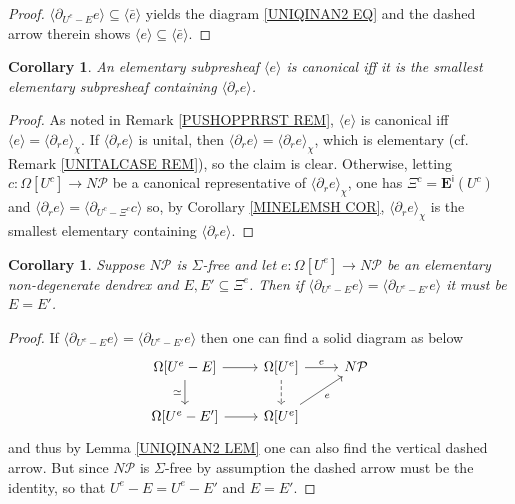 \documentclass[a4paper,10pt]{article}%
\numberwithin{equation}{section}
\numberwithin{figure}{section}
\newtheorem{corollary}[equation]{Corollary}%
\theoremstyle{definition} %
\newcommand{\1}{\ensuremath{\mathbbm 1}}%
\begin{document}
\begin{proof}
	$\langle \partial_{U^e - E} e\rangle
	\subseteq \langle \bar{e} \rangle$
	yields the diagram \eqref{UNIQINAN2 EQ}
	and the dashed arrow therein shows
	$\langle e\rangle
	\subseteq \langle \bar{e} \rangle$.
\end{proof}



\begin{corollary}\label{CANCHAR COR}
	An elementary subpresheaf $\langle e \rangle$
	is canonical iff
	it is the smallest elementary subpresheaf containing
	$\langle \partial_r e \rangle$.
\end{corollary}



\begin{proof}
	As noted in Remark \ref{PUSHOPPRRST REM}, 
	$\langle e \rangle$ is canonical iff
	$\langle e \rangle = \langle \partial_r e \rangle_{\chi}$.
	If $\langle \partial_r e \rangle$ is unital, then 
	$\langle \partial_r e \rangle = \langle \partial_r e \rangle_{\chi}$,
	which is elementary (cf. Remark \ref{UNITALCASE REM}), so the claim is clear.
	Otherwise, letting 
	$c \colon \Omega[U^c] \to N \mathcal{P}$
	be a canonical representative of
	$\langle \partial_r e \rangle_{\chi} $,
	one has
	$\Xi^c = \boldsymbol{E}^{\mathsf{i}}(U^c)$
	and
	$\langle \partial_r e \rangle = 
	\langle \partial_{U^c-\Xi^c} c \rangle$
	so, by Corollary \ref{MINELEMSH COR},
	$\langle \partial_r e \rangle_{\chi} $
	is the smallest elementary containing $\langle \partial_r e \rangle$.
\end{proof}



\begin{corollary}\label{ISODIFCL COR}
	Suppose $N \mathcal{P}$ is $\Sigma$-free
	and let $e \colon \Omega[U^e] \to N \mathcal{P}$
	be an elementary non-degenerate dendrex and
	$E,E' \subseteq \Xi^e$.
	Then if 
	$\langle \partial_{U^e-E} e \rangle
	=
	\langle \partial_{U^e-E'} e \rangle$
	it must be $E = E'$.
\end{corollary}



\begin{proof}
	If 
	$\langle \partial_{U^e-E} e \rangle
	=
	\langle \partial_{U^e-E'} e \rangle$
	then one can find a solid diagram as below
	\[
	\begin{tikzcd}
	\Omega[U^e-E] \ar{d}[swap]{\simeq} \ar{r} &
	\Omega[U^e] \ar{r}{e} \ar[dashed]{d} &
	N \mathcal{P}
	\\
	\Omega[U^e-E'] \ar{r} &
	\Omega[U^e] \ar{ru}[swap]{e} &
	\end{tikzcd}
	\]
	and thus by Lemma \ref{UNIQINAN2 LEM} one can also find the vertical dashed arrow.
	But since $N \mathcal{P}$ is $\Sigma$-free
	by assumption
	the dashed arrow must be the identity,
	so that $U^e-E=U^e-E'$ and $E=E'$.
\end{proof}
\end{document}
